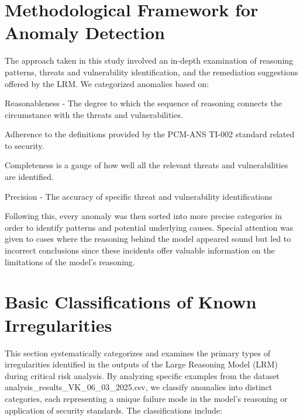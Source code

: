 \documentclass[sigconf]{acmart}
\begin{document}
\section{Methodological Framework for Anomaly Detection}
The approach taken in this study involved an in-depth examination of reasoning patterns, threats and vulnerability identification, and the remediation suggestions offered by the LRM. We categorized anomalies based on: 
 
Reasonableness - The degree to which the sequence of reasoning connects the circumstance with the threats and vulnerabilities. 
 
Adherence to the definitions provided by the PCM-ANS TI-002 standard related to security.

Completeness is a gauge of how well all the relevant threats and vulnerabilities are identified. 

Precision - The accuracy of specific threat and vulnerability identifications
 
Following this, every anomaly was then sorted into more precise categories in order to identify patterns and potential underlying causes. Special attention was given to cases where the reasoning behind the model appeared sound but led to incorrect conclusions since these incidents offer valuable information on the limitations of the model's reasoning.

\section{Basic Classifications of Known Irregularities}
This section systematically categorizes and examines the primary types of irregularities identified in the outputs of the Large Reasoning Model (LRM) during critical risk analysis. By analyzing specific examples from the dataset analysis\_results\_VK\_06\_03\_2025.csv, we classify anomalies into distinct categories, each representing a unique failure mode in the model's reasoning or application of security standards. The classifications include:
\end{document}
